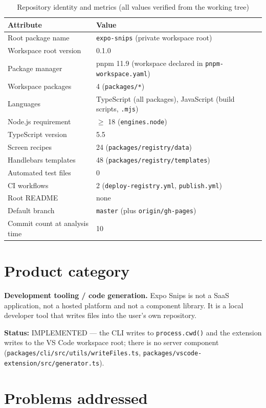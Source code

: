 \begin{table}[H]
\centering
\caption{Repository identity and metrics (all values verified from the working tree)}
\begin{tabular}{@{}L{5.4cm}L{9cm}@{}}
\toprule
\textbf{Attribute} & \textbf{Value} \\
\midrule
Root package name & \texttt{expo-snips} (private workspace root) \\
Workspace root version & 0.1.0 \\
Package manager & pnpm 11.9 (workspace declared in \texttt{pnpm-workspace.yaml}) \\
Workspace packages & 4 (\texttt{packages/*}) \\
Languages & TypeScript (all packages), JavaScript (build scripts, \texttt{.mjs}) \\
Node.js requirement & $\geq$ 18 (\texttt{engines.node}) \\
TypeScript version & 5.5 \\
Screen recipes & 24 (\texttt{packages/registry/data}) \\
Handlebars templates & 48 (\texttt{packages/registry/templates}) \\
Automated test files & 0 \\
CI workflows & 2 (\texttt{deploy-registry.yml}, \texttt{publish.yml}) \\
Root README & none \\
Default branch & \texttt{master} (plus \texttt{origin/gh-pages}) \\
Commit count at analysis time & 10 \\
\bottomrule
\end{tabular}
\end{table}

\section{Product category}

\textbf{Development tooling / code generation.} Expo Snips is not a SaaS
application, not a hosted platform and not a component library. It is a local
developer tool that writes files into the user's own repository.

\textbf{Status:} IMPLEMENTED --- the CLI writes to \texttt{process.cwd()} and the
extension writes to the VS Code workspace root; there is no server component
(\texttt{packages/cli/src/utils/writeFiles.ts},
\texttt{packages/vscode-extension/src/generator.ts}).

\section{Problems addressed}

